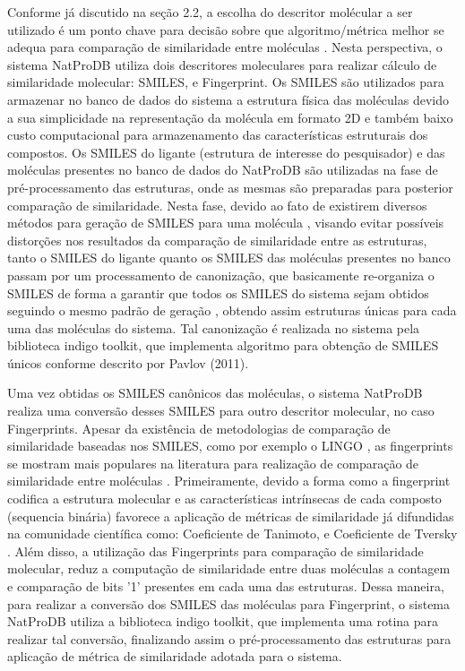  Conforme já discutido na seção 2.2, a escolha do descritor molécular a ser utilizado é um ponto chave para decisão sobre que algoritmo/métrica melhor se adequa para comparação de similaridade entre moléculas \cite{todeschini2008handbook}. Nesta perspectiva, o sistema NatProDB utiliza dois descritores moleculares para realizar cálculo de similaridade molecular: SMILES, e Fingerprint. Os SMILES são utilizados para armazenar no banco de dados do sistema a estrutura física das moléculas devido a sua simplicidade na representação da molécula em formato 2D e também baixo custo computacional para armazenamento das características estruturais dos compostos. Os SMILES do ligante (estrutura de interesse do pesquisador) e das moléculas presentes no banco de dados do NatProDB são utilizadas na fase de pré-processamento das estruturas, onde as mesmas são preparadas para posterior comparação de similaridade. Nesta fase, devido ao fato de existirem diversos métodos para geração de SMILES para uma molécula \cite{kumar2012}, visando evitar possíveis distorções nos resultados da comparação de similaridade entre as estruturas, tanto o SMILES do ligante quanto os SMILES das moléculas presentes no banco passam por um processamento de canonização, que basicamente re-organiza o SMILES de forma a garantir que todos os SMILES do sistema sejam obtidos seguindo o mesmo padrão de geração \cite{kumar2012}, obtendo assim estruturas únicas para cada uma das moléculas do sistema. Tal canonização é realizada no sistema pela biblioteca indigo toolkit, que implementa algoritmo para obtenção de SMILES únicos conforme descrito por Pavlov (2011).

Uma vez obtidas os SMILES canônicos das moléculas, o sistema NatProDB realiza uma conversão    
desses SMILES para outro descritor molecular, no caso Fingerprints. Apesar da existência de metodologias de comparação de similaridade baseadas nos SMILES, como por exemplo o LINGO \cite{vidal2005lingo}, as fingerprints se mostram mais populares na literatura para realização de comparação de similaridade entre moléculas \cite{varnek2011fragment}. Primeiramente, devido a forma como a fingerprint codifica a estrutura molecular e as características intrínsecas de cada composto (sequencia binária) favorece a aplicação de métricas de similaridade já difundidas na comunidade científica como: Coeficiente de Tanimoto, e Coeficiente de Tversky \cite{willett2003similarity}. Além disso, a utilização das Fingerprints para comparação de similaridade molecular, reduz a computação de similaridade entre duas moléculas a contagem e comparação de bits '1' presentes em cada uma das estruturas. Dessa maneira, para realizar  a conversão dos SMILES das moléculas para Fingerprint, o sistema NatProDB utiliza a biblioteca indigo toolkit, que implementa uma rotina para  realizar tal conversão, finalizando assim o pré-processamento das estruturas para aplicação de métrica de similaridade adotada para o sistema.

